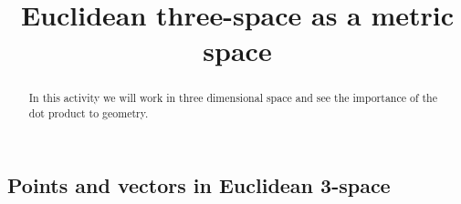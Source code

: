 \documentclass[newpage,hints,handout]{ximera}
\title{Euclidean three-space as a metric space}
\begin{document}
\begin{abstract}
In this activity we will work in three dimensional space and see the
importance of the dot product to geometry.
\end{abstract}
\maketitle

\subsection*{Points and vectors in Euclidean 3-space}

\end{document}
